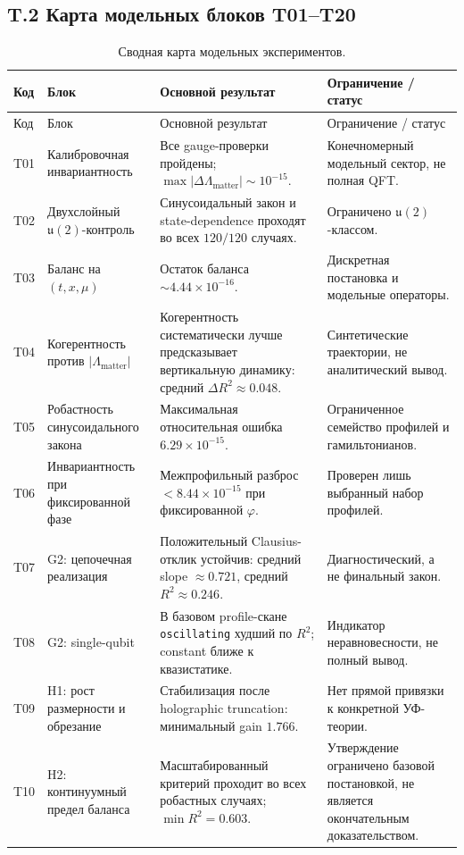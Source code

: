 \documentclass[11pt,a4paper]{article}
\theoremstyle{definition}
\theoremstyle{plain}
\theoremstyle{remark}
\begin{document}
\subsection*{T.2 Карта модельных блоков T01--T20}

{\small
\begin{longtable}{@{}p{1.1cm}p{3.2cm}p{5.1cm}p{3.8cm}@{}}
\caption{Сводная карта модельных экспериментов.}\label{tab:appendix_t_map}\\
\toprule
Код & Блок & Основной результат & Ограничение / статус \\
\midrule
\endfirsthead
\toprule
Код & Блок & Основной результат & Ограничение / статус \\
\midrule
\endhead
T01 & Калибровочная инвариантность & Все gauge-проверки пройдены; $\max|\Delta\Lambda_{\mathrm{matter}}|\sim10^{-15}$. & Конечномерный модельный сектор, не полная QFT. \\
T02 & Двухслойный $\mathfrak u(2)$-контроль & Синусоидальный закон и state-dependence проходят во всех $120/120$ случаях. & Ограничено $\mathfrak u(2)$-классом. \\
T03 & Баланс на $(t,x,\mu)$ & Остаток баланса $\sim4.44\times10^{-16}$. & Дискретная постановка и модельные операторы. \\
T04 & Когерентность против $|\Lambda_{\mathrm{matter}}|$ & Когерентность систематически лучше предсказывает вертикальную динамику: средний $\Delta R^2\approx0.048$. & Синтетические траектории, не аналитический вывод. \\
T05 & Робастность синусоидального закона & Максимальная относительная ошибка $6.29\times10^{-15}$. & Ограниченное семейство профилей и гамильтонианов. \\
T06 & Инвариантность при фиксированной фазе & Межпрофильный разброс $<8.44\times10^{-15}$ при фиксированной $\varphi$. & Проверен лишь выбранный набор профилей. \\
T07 & G2: цепочечная реализация & Положительный Clausius-отклик устойчив: средний slope $\approx0.721$, средний $R^2\approx0.246$. & Диагностический, а не финальный закон. \\
T08 & G2: single-qubit & В базовом profile-скане \texttt{oscillating} худший по $R^2$; constant ближе к квазистатике. & Индикатор неравновесности, не полный вывод. \\
T09 & H1: рост размерности и обрезание & Стабилизация после holographic truncation: минимальный gain $1.766$. & Нет прямой привязки к конкретной УФ-теории. \\
T10 & H2: континуумный предел баланса & Масштабированный критерий проходит во всех робастных случаях; $\min R^2=0.603$. & Утверждение ограничено базовой постановкой, не является окончательным доказательством. \\

\end{longtable}}
\end{document}
